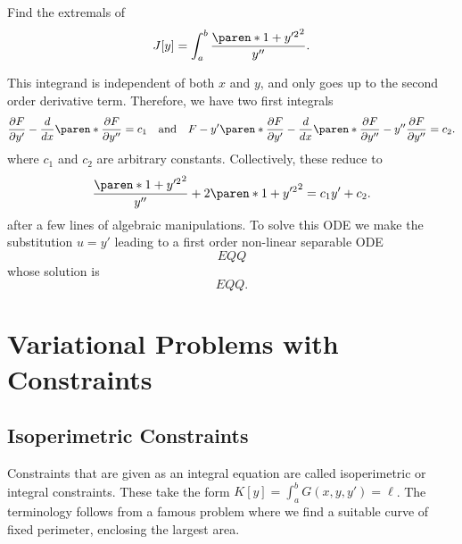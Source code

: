 \documentclass[11pt]{penrose}
\begin{document}
\begin{negg}
    Find the extremals of
    \begin{equation}
        J[y] = \int_a^b \frac{\paren*{1 + y'^2}^2}{y''}.
    \end{equation}

    This integrand is independent of both $x$ and $y$, and only goes up to the second order derivative term. Therefore, we have two first integrals
    \begin{equation}
        \frac{\pd F}{\pd y'} - \frac{d}{dx} \paren*{\frac{\pd F}{\pd y''}} = c_1
        \quad\text{and}\quad
        F - y' \paren*{\frac{\pd F}{\pd y'} - \frac{d}{dx}\paren*{\frac{\pd F}{\pd y''}}} - y'' \frac{\pd F}{\pd y''} = c_2.
    \end{equation}
    where $c_1$ and $c_2$ are arbitrary constants. Collectively, these reduce to
    \begin{equation}
        \frac{\paren*{1 + y'^2}^2}{y''} + 2 \paren*{1 + y'^2}^2 = c_1 y' + c_2.
    \end{equation}
    after a few lines of algebraic manipulations. To solve this ODE we make the substitution $u = y'$ leading to a first order non-linear separable ODE
    \begin{equation}
        EQQ
    \end{equation}
    whose solution is
    \begin{equation}
        EQQ.
    \end{equation}

\end{negg}

\section{Variational Problems with Constraints}

\subsection{Isoperimetric Constraints}
Constraints that are given as an integral equation are called isoperimetric or integral constraints. These take the form $K[y] = \int_a^b G(x,y,y') = \ell$. The terminology follows from a famous problem where we find a suitable curve of fixed perimeter, enclosing the largest area.
\end{document}
